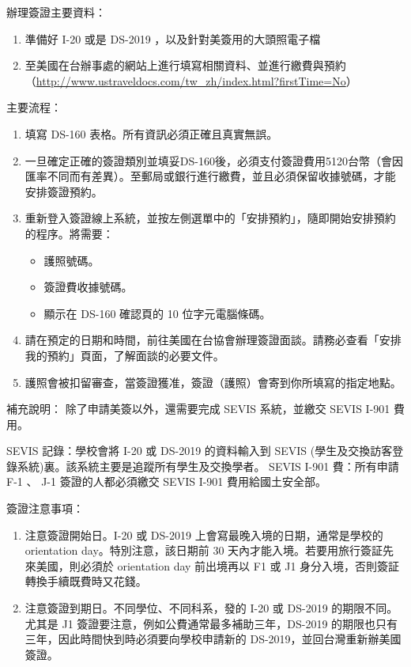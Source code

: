 \documentclass[10pt,a4paper]{book}
\begin{document}
\begin{CJK}{UTF8}{bkai}
辦理簽證主要資料：
\begin{enumerate}
\item 準備好 I-20 或是 DS-2019 ，以及針對美簽用的大頭照電子檔
\item 至美國在台辦事處的網站上進行填寫相關資料、並進行繳費與預約（\url{http://www.ustraveldocs.com/tw_zh/index.html?firstTime=No}）
\end{enumerate}

主要流程：
\begin{enumerate}
\item 填寫 DS-160 表格。所有資訊必須正確且真實無誤。
\item 一旦確定正確的簽證類別並填妥DS-160後，必須支付簽證費用5120台幣（會因匯率不同而有差異）。至郵局或銀行進行繳費，並且必須保留收據號碼，才能安排簽證預約。
\item 重新登入簽證線上系統，並按左側選單中的「安排預約」，隨即開始安排預約的程序。將需要：
\begin{itemize}
\item 護照號碼。
\item 簽證費收據號碼。
\item 顯示在 DS-160 確認頁的 10 位字元電腦條碼。
\end{itemize}
\item 請在預定的日期和時間，前往美國在台協會辦理簽證面談。請務必查看「安排我的預約」頁面，了解面談的必要文件。
\item 護照會被扣留審查，當簽證獲准，簽證（護照）會寄到你所填寫的指定地點。
\end{enumerate}

補充說明：
除了申請美簽以外，還需要完成 SEVIS 系統，並繳交 SEVIS I-901 費用。

SEVIS 記錄：學校會將 I-20 或 DS-2019 的資料輸入到 SEVIS (學生及交換訪客登錄系統)裏。該系統主要是追蹤所有學生及交換學者。
SEVIS I-901 費：所有申請 F-1 、 J-1 簽證的人都必須繳交 SEVIS I-901 費用給國土安全部。

簽證注意事項：
\begin{enumerate}
\item 注意簽證開始日。I-20 或 DS-2019 上會寫最晚入境的日期，通常是學校的 orientation day。特別注意，該日期前 30 天內才能入境。若要用旅行簽証先來美國，則必須於 orientation day 前出境再以 F1 或 J1 身分入境，否則簽証轉換手續既費時又花錢。

\item 注意簽證到期日。不同學位、不同科系，發的 I-20 或 DS-2019 的期限不同。尤其是 J1 簽證要注意，例如公費通常最多補助三年，DS-2019 的期限也只有三年，因此時間快到時必須要向學校申請新的 DS-2019，並回台灣重新辦美國簽證。


\end{enumerate}
\end{CJK}
\end{document}
